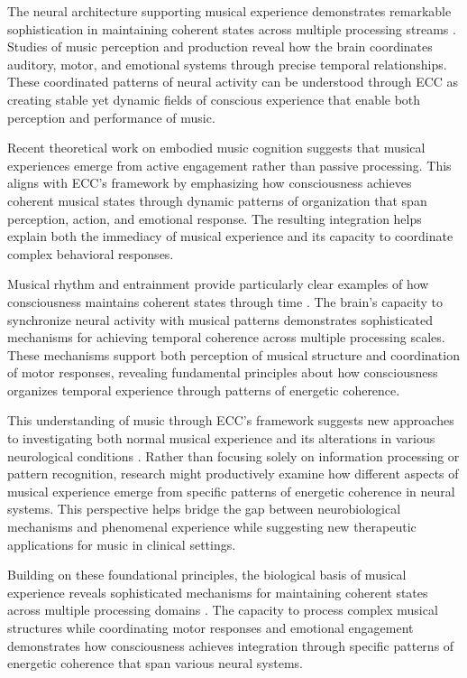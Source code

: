\begin{refsection}
The neural architecture supporting musical experience demonstrates remarkable sophistication in maintaining coherent states across multiple processing streams \cite{Zatorre2007}. Studies of music perception and production reveal how the brain coordinates auditory, motor, and emotional systems through precise temporal relationships. These coordinated patterns of neural activity can be understood through ECC as creating stable yet dynamic fields of conscious experience that enable both perception and performance of music.

Recent theoretical work on embodied music cognition \cite{Krueger2009} suggests that musical experiences emerge from active engagement rather than passive processing. This aligns with ECC's framework by emphasizing how consciousness achieves coherent musical states through dynamic patterns of organization that span perception, action, and emotional response. The resulting integration helps explain both the immediacy of musical experience and its capacity to coordinate complex behavioral responses.

Musical rhythm and entrainment provide particularly clear examples of how consciousness maintains coherent states through time \cite{Clayton2005}. The brain's capacity to synchronize neural activity with musical patterns demonstrates sophisticated mechanisms for achieving temporal coherence across multiple processing scales. These mechanisms support both perception of musical structure and coordination of motor responses, revealing fundamental principles about how consciousness organizes temporal experience through patterns of energetic coherence.

This understanding of music through ECC's framework suggests new approaches to investigating both normal musical experience and its alterations in various neurological conditions \cite{Schaefer2014}. Rather than focusing solely on information processing or pattern recognition, research might productively examine how different aspects of musical experience emerge from specific patterns of energetic coherence in neural systems. This perspective helps bridge the gap between neurobiological mechanisms and phenomenal experience while suggesting new therapeutic applications for music in clinical settings.

Building on these foundational principles, the biological basis of musical experience reveals sophisticated mechanisms for maintaining coherent states across multiple processing domains \cite{Fitch2015}. The capacity to process complex musical structures while coordinating motor responses and emotional engagement demonstrates how consciousness achieves integration through specific patterns of energetic coherence that span various neural systems.


\end{refsection}
